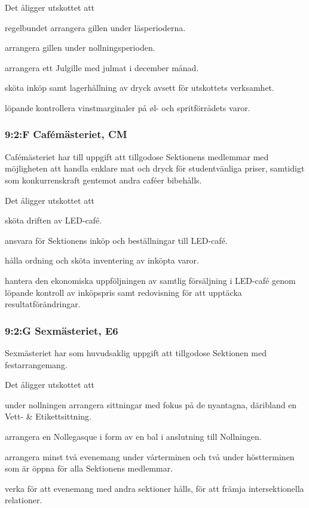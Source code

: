 \documentclass[../_main/handlingar.tex]{subfiles}
\begin{document}
\begin{attsatser}
        Det åligger utskottet att
        \begin{tightdashlist}
        \item regelbundet arrangera gillen under läsperioderna.
        \item arrangera gillen under nollningsperioden.
        \item arrangera ett Julgille med julmat i december månad.
        \item sköta inköp samt lagerhållning av dryck avsett för utskottets verksamhet.
        \item löpande kontrollera vinstmarginaler på øl- och spritförrådets varor.
        \end{tightdashlist}

        \subsubsection*{9:2:F Cafémästeriet, CM}
        Cafémästeriet har till uppgift att tillgodose Sektionens medlemmar med möjligheten att handla enklare mat och dryck för studentvänliga priser, samtidigt som konkurrenskraft gentemot andra caféer bibehålls.

        Det åligger utskottet att
        \begin{tightdashlist}
        \item sköta driften av LED-café.
        \item ansvara för Sektionens inköp och beställningar till LED-café.
        \item hålla ordning och sköta inventering av inköpta varor.
        \item hantera den ekonomiska uppföljningen av samtlig försäljning i LED-café genom löpande kontroll av inköpspris samt redovisning för att upptäcka resultatförändringar.
        \end{tightdashlist}

        \subsubsection*{9:2:G Sexmästeriet, E6}
        Sexmästeriet har som huvudsaklig uppgift att tillgodose Sektionen med festarrangemang.

        Det åligger utskottet att
        \begin{tightdashlist}
        \item under nollningen arrangera sittningar med fokus på de nyantagna, däribland en Vett- \& Etikettsittning.
        \item arrangera en Nollegasque i form av en bal i anslutning till Nollningen.
        \item arrangera minst två evenemang under vårterminen och två under höstterminen som är öppna för alla Sektionens medlemmar.
        \item verka för att evenemang med andra sektioner hålls, för att främja intersektionella relationer.
        \end{tightdashlist}


\end{attsatser}
\end{document}
